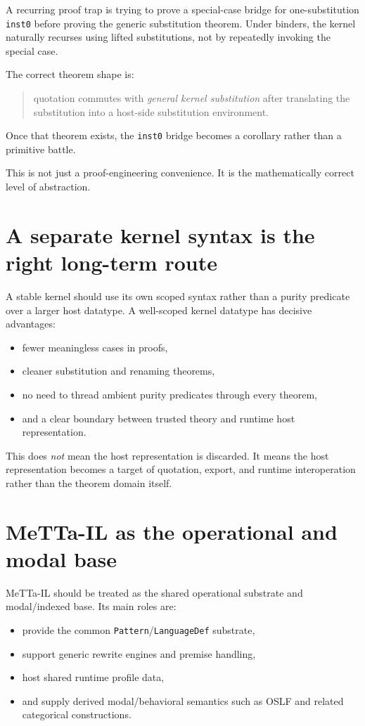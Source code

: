\documentclass[11pt]{article}
\begin{document}
A recurring proof trap is trying to prove a special-case bridge for one-substitution \texttt{inst0} before proving the generic substitution theorem. Under binders, the kernel naturally recurses using lifted substitutions, not by repeatedly invoking the special case.

The correct theorem shape is:

\begin{quote}
quotation commutes with \emph{general kernel substitution} after translating the substitution into a host-side substitution environment.
\end{quote}

Once that theorem exists, the \texttt{inst0} bridge becomes a corollary rather than a primitive battle.

This is not just a proof-engineering convenience. It is the mathematically correct level of abstraction.

\section{A separate kernel syntax is the right long-term route}

A stable kernel should use its own scoped syntax rather than a purity predicate over a larger host datatype. A well-scoped kernel datatype has decisive advantages:
\begin{itemize}
  \item fewer meaningless cases in proofs,
  \item cleaner substitution and renaming theorems,
  \item no need to thread ambient purity predicates through every theorem,
  \item and a clear boundary between trusted theory and runtime host representation.
\end{itemize}

This does \emph{not} mean the host representation is discarded. It means the host representation becomes a target of quotation, export, and runtime interoperation rather than the theorem domain itself.

\section{MeTTa-IL as the operational and modal base}

MeTTa-IL should be treated as the shared operational substrate and modal/indexed base. Its main roles are:
\begin{itemize}
  \item provide the common \texttt{Pattern}/\texttt{LanguageDef} substrate,
  \item support generic rewrite engines and premise handling,
  \item host shared runtime profile data,
  \item and supply derived modal/behavioral semantics such as OSLF and related categorical constructions.
\end{itemize}
\end{document}
